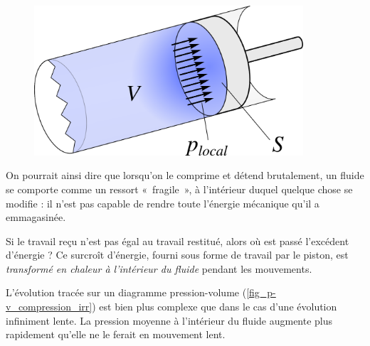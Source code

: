 		\begin{figure}
			\begin{center}
				\includegraphics[width=10cm]{images/travail_cylindre_3.png}
			\end{center}
			\label{fig_piston_fluide_rapide}
		\end{figure}

		On pourrait ainsi dire que lorsqu’on le comprime et détend brutalement, un fluide se comporte comme un ressort «~fragile~», à l’intérieur duquel quelque chose se modifie : il n’est pas capable de rendre toute l’énergie mécanique qu’il a emmagasinée.

		Si le travail reçu n’est pas égal au travail restitué, alors où est passé l’excédent d’énergie ? Ce surcroît d’énergie, fourni sous forme de travail par le piston, est \emph{transformé en chaleur à l’intérieur du fluide} pendant les mouvements.

		\onlyamphibook{\clearfloats}%
		L’évolution tracée sur un diagramme pression-volume (\cref{fig_p-v_compression_irr}) est bien plus complexe que dans le cas d’une évolution infiniment lente. La pression moyenne à l’intérieur du fluide augmente plus rapidement qu’elle ne le ferait en mouvement lent.

